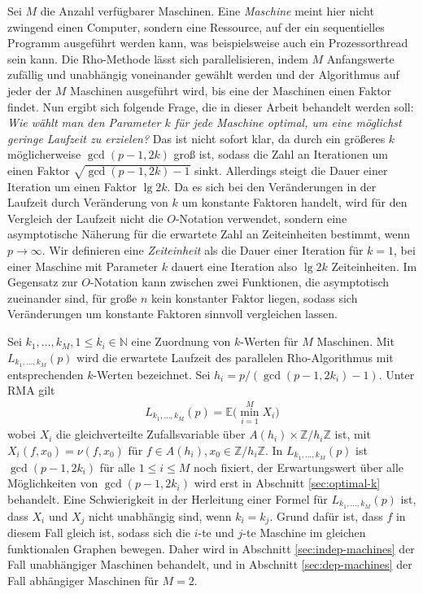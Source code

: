 \documentclass[a4paper, 11pt, ngerman]{article}
\newcommand{\E}{\mathbb{E}}
\newcommand{\N}{\mathbb{N}}
\newcommand{\Z}{\mathbb{Z}}
\theoremstyle{definition}
\theoremstyle{plain}
\theoremstyle{remark}
\begin{document}
Sei $M$ die Anzahl verfügbarer Maschinen. Eine \emph{Maschine} meint hier nicht zwingend einen Computer, sondern eine Ressource, auf der ein sequentielles Programm ausgeführt werden kann, was beispielsweise auch ein Prozessorthread sein kann. Die Rho-Methode lässt sich parallelisieren, indem $M$ Anfangswerte zufällig und unabhängig voneinander gewählt werden und der Algorithmus auf jeder der $M$ Maschinen ausgeführt wird, bis eine der Maschinen einen Faktor findet. Nun ergibt sich folgende Frage, die in dieser Arbeit behandelt werden soll: \emph{Wie wählt man den Parameter $k$ für jede Maschine optimal, um eine möglichst geringe Laufzeit zu erzielen?} Das ist nicht sofort klar, da durch ein größeres $k$ möglicherweise $\gcd(p - 1, 2k)$ groß ist, sodass die Zahl an Iterationen um einen Faktor $\sqrt{\gcd(p - 1, 2k) -1}$ sinkt. Allerdings steigt die Dauer einer Iteration um einen Faktor $\lg 2k$. Da es sich bei den Veränderungen in der Laufzeit durch Veränderung von $k$ um konstante Faktoren handelt, wird für den Vergleich der Laufzeit nicht die $O$-Notation verwendet, sondern eine asymptotische Näherung für die erwartete Zahl an Zeiteinheiten bestimmt, wenn $p \to \infty$. Wir definieren eine \emph{Zeiteinheit} als die Dauer einer Iteration für $k = 1$, bei einer Maschine mit Parameter $k$ dauert eine Iteration also $\lg 2k$ Zeiteinheiten. Im Gegensatz zur $O$-Notation kann zwischen zwei Funktionen, die asymptotisch zueinander sind, für große $n$ kein konstanter Faktor liegen, sodass sich Veränderungen um konstante Faktoren sinnvoll vergleichen lassen.

Sei $k_1, \dots, k_M, 1 \le k_i \in \N$ eine Zuordnung von $k$-Werten für $M$ Maschinen. Mit $L_{k_1, \dots, k_M}(p)$ wird die erwartete Laufzeit des parallelen Rho-Algorithmus mit entsprechenden $k$-Werten bezeichnet. Sei $h_i = p/(\gcd(p - 1, 2k_i) - 1)$. Unter RMA gilt
\begin{align}
    L_{k_1, \dots, k_M}(p) = \E \bigg ( \min_{i = 1}^M X_i \bigg )
    \label{lk-definition}
\end{align}
wobei $X_i$ die gleichverteilte Zufallsvariable über $A(h_i) \times \Z/h_i\Z$ ist, mit $X_i(f, x_0) = \nu(f, x_0)$ für $f \in A(h_i), x_0 \in \Z/h_i\Z$. In $L_{k_1, \dots, k_M}(p)$ ist $\gcd(p - 1, 2k_i)$ für alle $1 \le i \le M$ noch fixiert, der Erwartungswert über alle Möglichkeiten von $\gcd(p - 1, 2k_i)$ wird erst in Abschnitt \ref{sec:optimal-k} behandelt. Eine Schwierigkeit in der Herleitung einer Formel für $L_{k_1, \dots, k_M}(p)$ ist, dass $X_i$ und $X_j$ nicht unabhängig sind, wenn $k_i = k_j$. Grund dafür ist, dass $f$ in diesem Fall gleich ist, sodass sich die $i$-te und $j$-te Maschine im gleichen funktionalen Graphen bewegen. Daher wird in Abschnitt \ref{sec:indep-machines} der Fall unabhängiger Maschinen behandelt, und in Abschnitt \ref{sec:dep-machines} der Fall abhängiger Maschinen für $M = 2$.
\end{document}
